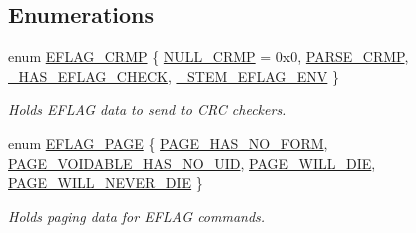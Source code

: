 \subsection*{Enumerations}
\begin{DoxyCompactItemize}
\item 
enum \hyperlink{namespacecrunchy_acc00ed7986064df9b2232c76a22709c4}{E\+F\+L\+A\+G\+\_\+\+C\+R\+MP} \{ \hyperlink{namespacecrunchy_acc00ed7986064df9b2232c76a22709c4a8cc66679b59c48ccb2d9b35f3761979d}{N\+U\+L\+L\+\_\+\+C\+R\+MP} = 0x0, 
\hyperlink{namespacecrunchy_acc00ed7986064df9b2232c76a22709c4a4fcc2f729bd2b01f871e8f0cea43127c}{P\+A\+R\+S\+E\+\_\+\+C\+R\+MP}, 
\hyperlink{namespacecrunchy_acc00ed7986064df9b2232c76a22709c4a1551775cd317af7882c75d96d25ab819}{\+\_\+\+H\+A\+S\+\_\+\+E\+F\+L\+A\+G\+\_\+\+C\+H\+E\+CK}, 
\hyperlink{namespacecrunchy_acc00ed7986064df9b2232c76a22709c4ab85d7a8c84ed693d462fd413330c33c5}{\+\_\+\+S\+T\+E\+M\+\_\+\+E\+F\+L\+A\+G\+\_\+\+E\+NV}
 \}\begin{DoxyCompactList}\small\item\em Holds E\+F\+L\+AG data to send to C\+RC checkers. \end{DoxyCompactList}
\item 
enum \hyperlink{namespacecrunchy_ad63d9cf0dc471a6e9379c12cd89fb5a9}{E\+F\+L\+A\+G\+\_\+\+P\+A\+GE} \{ \hyperlink{namespacecrunchy_ad63d9cf0dc471a6e9379c12cd89fb5a9a48d2d3c0ba354f76e55077d68980cfba}{P\+A\+G\+E\+\_\+\+H\+A\+S\+\_\+\+N\+O\+\_\+\+F\+O\+RM}, 
\hyperlink{namespacecrunchy_ad63d9cf0dc471a6e9379c12cd89fb5a9a155358a15b014d55f44420c2873a1462}{P\+A\+G\+E\+\_\+\+V\+O\+I\+D\+A\+B\+L\+E\+\_\+\+H\+A\+S\+\_\+\+N\+O\+\_\+\+U\+ID}, 
\hyperlink{namespacecrunchy_ad63d9cf0dc471a6e9379c12cd89fb5a9afc2fedd6cffdfcc42f3688718a868694}{P\+A\+G\+E\+\_\+\+W\+I\+L\+L\+\_\+\+D\+IE}, 
\hyperlink{namespacecrunchy_ad63d9cf0dc471a6e9379c12cd89fb5a9a7e1cf7b87501f14c7b257dcd9547c9f1}{P\+A\+G\+E\+\_\+\+W\+I\+L\+L\+\_\+\+N\+E\+V\+E\+R\+\_\+\+D\+IE}
 \}\begin{DoxyCompactList}\small\item\em Holds paging data for E\+F\+L\+AG commands. \end{DoxyCompactList}
\end{DoxyCompactItemize}
